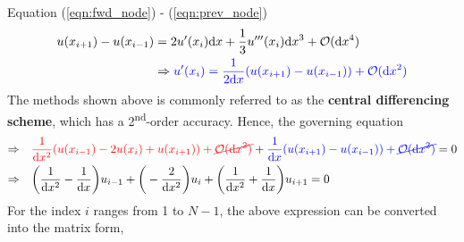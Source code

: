 \documentclass[a4paper]{article}
\begin{document}
Equation (\ref{eqn:fwd_node}) - (\ref{eqn:prev_node})
\begin{align*}
    u(x_{i+1}) - u(x_{i-1}) & = 2 u'(x_i)\mathrm{d}x + \frac{1}{3}u'''(x_i) \mathrm{d}x^3 + \mathcal{O}(\mathrm{d}x^4) \\
    & \Rightarrow {\color{blue} u'(x_i) = \frac{1}{2\mathrm{d}x} (u(x_{i+1}) - u(x_{i-1})) + \mathcal{O}(\mathrm{d}x^2)}
\end{align*}
The methods shown above is commonly referred to as the \textbf{central differencing scheme}, which has a 2\textsuperscript{nd}-order accuracy.
Hence, the governing equation
\begin{align*}
    \Rightarrow \quad & {\color{red} \frac{1}{\mathrm{d}x^2} (u(x_{i-1}) - 2u(x_i) + u(x_{i+1})) + \cancel{\mathcal{O}(\mathrm{d}x^2)}} + {\color{blue} \frac{1}{\mathrm{d}x} (u(x_{i+1}) - u(x_{i-1})) + \cancel{\mathcal{O}(\mathrm{d}x^2)}} = 0 \\
    \Rightarrow \quad & \bigg(\frac{1}{\mathrm{d}x^2} - \frac{1}{\mathrm{d}x} \bigg) u_{i-1} + \bigg(-\frac{2}{\mathrm{d}x^2}\bigg)u_i + \bigg(\frac{1}{\mathrm{d}x^2}+\frac{1}{\mathrm{d}x}\bigg) u_{i+1} = 0
\end{align*}
For the index $i$ ranges from 1 to $N-1$, the above expression can be converted into the matrix form,
\end{document}
